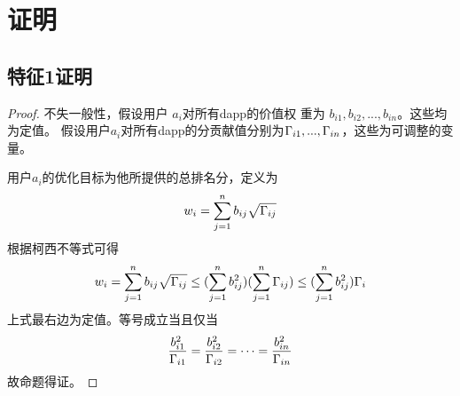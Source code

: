 \section{证明}
\subsection{特征1证明}
\begin{proof}

不失一般性，假设用户 $a_i$对所有dapp的价值权
重为 $b_{i1}, b_{i2}, ..., b_{in}$。这些均为定值。
假设用户$a_i$对所有dapp的分贡献值分别为$\Gamma_{i1},...,\Gamma_{in}$，这些为可调整的变量。

用户$a_i$的优化目标为他所提供的总排名分，定义为
$$w_i = \sum_{j=1}^n b_{ij}\sqrt{\Gamma_{ij}}$$
根据柯西不等式可得
$$w_i = \sum_{j=1}^n b_{ij}\sqrt{\Gamma_{ij}} \leq (\sum_{j=1}^n b_{ij}^2)(\sum_{j=1}^n \Gamma_{ij}) \leq (\sum_{j=1}^n b_{ij}^2)\Gamma_i$$
上式最右边为定值。等号成立当且仅当
$$\frac{b_{i1}^2}{\Gamma_{i1}}=\frac{b_{i2}^2}{\Gamma_{i2}}=\cdots=\frac{b_{in}^2}{\Gamma_{in}}$$
故命题得证。

\end{proof}
